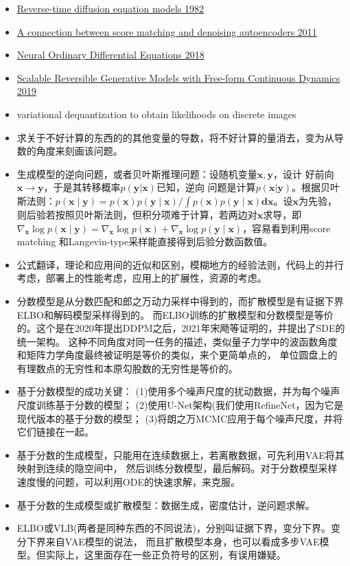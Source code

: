 \begin{itemize}
  \item \href{B.D}{Reverse-time diffusion equation models 1982}
  \item \href{c.c}{A connection between score matching and denoising autoencoders 2011}
  \item \href{n.c}{Neural Ordinary Differential Equations 2018}
  \item \href{s.c}{Scalable Reversible Generative Models with Free-form Continuous Dynamics 2019}
  \item variational dequantization to obtain likelihoods on discrete images
  \item 求关于不好计算的东西的的其他变量的导数，将不好计算的量消去，变为从导数的角度来刻画该问题。
  \item 生成模型的逆向问题，或者贝叶斯推理问题：设随机变量$\mathbf{x}, \mathbf{y}$，设计
  好前向$\mathbf{x} \rightarrow \mathbf{y}$，于是其转移概率$p(\mathbf{y}|\mathbf{x})$已知，逆向
  问题是计算$p(\mathbf{x}|\mathbf{y})$。根据贝叶斯法则：$p(\mathbf{x} \mid \mathbf{y})=p(\mathbf{x}) p(\mathbf{y}
  \mid \mathbf{x}) / \int p(\mathbf{x}) p(\mathbf{y} \mid \mathbf{x}) \mathbf{d} \mathbf{x}$。设$\mathbf{x}$为先验，
  则后验若按照贝叶斯法则，但积分项难于计算，若两边对$\mathbf{x}$求导，即$\nabla_{\mathbf{x}} \log p(\mathbf{x} \mid \mathbf{y})=\nabla_{\mathbf{x}} \log p(\mathbf{x})+\nabla_{\mathbf{x}} \log p(\mathbf{y} \mid \mathbf{x})$，容易看到利用score matching 和Langevin-type采样能直接得到后验分数函数值。
  \item 公式翻译，理论和应用间的近似和区别，模糊地方的经验法则，代码上的并行考虑，部署上的性能考虑，应用上的扩展性，资源的考虑。
  \item 分数模型是从分数匹配和郎之万动力采样中得到的，而扩散模型是有证据下界ELBO和解码模型采样得到的。
  而ELBO训练的扩散模型和分数模型是等价的。这个是在2020年提出DDPM之后，2021年宋飏等证明的，并提出了SDE的统一架构。
  这种不同角度对同一任务的描述，类似量子力学中的波函数角度和矩阵力学角度最终被证明是等价的类似，来个更简单点的，
  单位圆盘上的有理数点的无穷性和本原勾股数的无穷性是等价的。
  \item 基于分数模型的成功关键：
  (1)使用多个噪声尺度的扰动数据，并为每个噪声尺度训练基于分数的模型；
  (2)使用U-Net架构(我们使用RefineNet，因为它是现代版本的基于分数的模型；
  (3)将朗之万MCMC应用于每个噪声尺度，并将它们链接在一起。
  \item 基于分数的生成模型，只能用在连续数据上，若离散数据，可先利用VAE将其映射到连续的隐空间中，
  然后训练分数模型，最后解码。对于分数模型采样速度慢的问题，可以利用ODE的快速求解，来克服。
  \item 基于分数的生成模型或扩散模型：数据生成，密度估计，逆问题求解。
  \item ELBO或VLB(两者是同种东西的不同说法)，分别叫证据下界，变分下界。变分下界来自VAE模型的说法，
  而且扩散模型本身，也可以看成多步VAE模型。但实际上，这里面存在一些正负符号的区别，有误用嫌疑。


\end{itemize}
